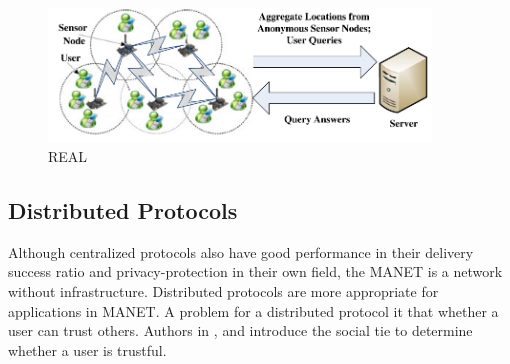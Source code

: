 \begin{figure} [H]
  \centering 
  \includegraphics[width=4.0in]{figures/FIG_REAL_26.png}
  \caption{REAL \cite{C25}} 
  \label{fig:REAL} %
\end{figure}

\subsection{ Distributed Protocols}

\noindent Although centralized protocols also have good performance in their delivery success ratio and privacy-protection in their own field, the MANET is a network without infrastructure. Distributed protocols are more appropriate for applications in MANET. A problem for a distributed protocol it that whether a user can trust others. Authors in \cite{C16}, \cite{C17} and \cite{C18} introduce the social tie to determine whether a user is trustful.

